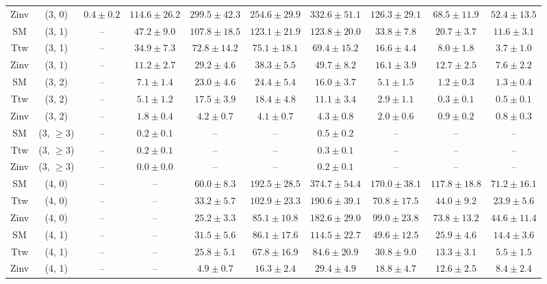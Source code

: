 \begin{table}[h!]
{\begin{tabular}{cccccccccc}
	Zinv & (3, 0) & $0.4\pm 0.2$ & $114.6\pm 26.2$ & $299.5\pm 42.3$ & $254.6\pm 29.9$ & $332.6\pm 51.1$ & $126.3\pm 29.1$ & $68.5\pm 11.9$ & $52.4\pm 13.5$ \\[0.5ex] 
	SM & (3, 1) & -- & $47.2\pm 9.0$ & $107.8\pm 18.5$ & $123.1\pm 21.9$ & $123.8\pm 20.0$ & $33.8\pm 7.8$ & $20.7\pm 3.7$ & $11.6\pm 3.1$ \\[0.5ex] 
	Ttw & (3, 1) & -- & $34.9\pm 7.3$ & $72.8\pm 14.2$ & $75.1\pm 18.1$ & $69.4\pm 15.2$ & $16.6\pm 4.4$ & $8.0\pm 1.8$ & $3.7\pm 1.0$ \\[0.5ex] 
	Zinv & (3, 1) & -- & $11.2\pm 2.7$ & $29.2\pm 4.6$ & $38.3\pm 5.5$ & $49.7\pm 8.2$ & $16.1\pm 3.9$ & $12.7\pm 2.5$ & $7.6\pm 2.2$ \\[0.5ex] 
	SM & (3, 2) & -- & $7.1\pm 1.4$ & $23.0\pm 4.6$ & $24.4\pm 5.4$ & $16.0\pm 3.7$ & $5.1\pm 1.5$ & $1.2\pm 0.3$ & $1.3\pm 0.4$ \\[0.5ex] 
	Ttw & (3, 2) & -- & $5.1\pm 1.2$ & $17.5\pm 3.9$ & $18.4\pm 4.8$ & $11.1\pm 3.4$ & $2.9\pm 1.1$ & $0.3\pm 0.1$ & $0.5\pm 0.1$ \\[0.5ex] 
	Zinv & (3, 2) & -- & $1.8\pm 0.4$ & $4.2\pm 0.7$ & $4.1\pm 0.7$ & $4.3\pm 0.8$ & $2.0\pm 0.6$ & $0.9\pm 0.2$ & $0.8\pm 0.3$ \\[0.5ex] 
	SM & (3, $\ge3$) & -- & $0.2\pm 0.1$ & -- & -- & $0.5\pm 0.2$ & -- & -- & -- \\[0.5ex] 
	Ttw & (3, $\ge3$) & -- & $0.2\pm 0.1$ & -- & -- & $0.3\pm 0.1$ & -- & -- & -- \\[0.5ex] 
	Zinv & (3, $\ge3$) & -- & $0.0\pm 0.0$ & -- & -- & $0.2\pm 0.1$ & -- & -- & -- \\[0.5ex] 
	SM & (4, 0) & -- & -- & $60.0\pm 8.3$ & $192.5\pm 28.5$ & $374.7\pm 54.4$ & $170.0\pm 38.1$ & $117.8\pm 18.8$ & $71.2\pm 16.1$ \\[0.5ex] 
	Ttw & (4, 0) & -- & -- & $33.2\pm 5.7$ & $102.9\pm 23.3$ & $190.6\pm 39.1$ & $70.8\pm 17.5$ & $44.0\pm 9.2$ & $23.9\pm 5.6$ \\[0.5ex] 
	Zinv & (4, 0) & -- & -- & $25.2\pm 3.3$ & $85.1\pm 10.8$ & $182.6\pm 29.0$ & $99.0\pm 23.8$ & $73.8\pm 13.2$ & $44.6\pm 11.4$ \\[0.5ex] 
	SM & (4, 1) & -- & -- & $31.5\pm 5.6$ & $86.1\pm 17.6$ & $114.5\pm 22.7$ & $49.6\pm 12.5$ & $25.9\pm 4.6$ & $14.4\pm 3.6$ \\[0.5ex] 
	Ttw & (4, 1) & -- & -- & $25.8\pm 5.1$ & $67.8\pm 16.9$ & $84.6\pm 20.9$ & $30.8\pm 9.0$ & $13.3\pm 3.1$ & $5.5\pm 1.5$ \\[0.5ex] 
	Zinv & (4, 1) & -- & -- & $4.9\pm 0.7$ & $16.3\pm 2.4$ & $29.4\pm 4.9$ & $18.8\pm 4.7$ & $12.6\pm 2.5$ & $8.4\pm 2.4$ \\[0.5ex] 

\end{tabular}}
\end{table}
